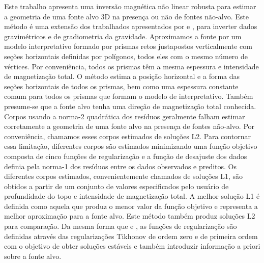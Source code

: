 Este trabalho apresenta uma inversão magnética não linear robusta para estimar a geometria de uma fonte alvo 3D na presença ou não de fontes não-alvo.
Este método é uma extensão dos trabalhados apresentados por \citet{oliveirajr_etal2011} e 
\citet{oliveirajr_barbosa2013}, para inverter dados gravimétricos e de gradiometria da gravidade.
Aproximamos a fonte por um modelo interpretativo formado por prismas retos justapostos verticalmente com seções horizontais definidas por polígonos, todos eles com o mesmo número de vértices.
Por conveniência, todos os prismas têm a mesma espessura e intensidade de magnetização total.
O método estima a posição horizontal e a forma das seções horizontais de todos os prismas, bem como uma espessura constante comum para todos os prismas que formam o modelo de interpretativo.
Também presume-se que a fonte alvo tenha uma direção de magnetização total conhecida.
Corpos usando a norma-2 quadrática dos resíduos geralmente falham estimar corretamente a geometria de uma fonte alvo na presença de fontes não-alvo.
Por conveniência, chamamos esses corpos estimados de soluções L2.
Para contornar essa limitação, diferentes corpos são estimados minimizando uma função objetivo composta de cinco funções de regularização e a função de desajuste dos dados definia pela norma-1 dos resíduos entre os dados observados e preditos.
Os diferentes corpos estimados, convenientemente chamados de soluções L1, são obtidos a partir de um conjunto de valores especificados pelo usuário de profundidade do topo e intensidade de magnetização total.
A melhor solução L1 é definida como aquela que produz o menor valor da função objetivo e representa a melhor aproximação para a fonte alvo.
Este método também produz soluções L2 para comparação.
Da mesma forma que \citet{oliveirajr_etal2011} e \citet{oliveirajr_barbosa2013}, as funções de regularização são definidas através das regularizações Tikhonov de ordem zero e de primeira ordem \citep[por exemplo,][p. 96 e 104]{aster_etal2019} com o objetivo de obter soluções estáveis e também introduzir informação a priori sobre a fonte alvo.

